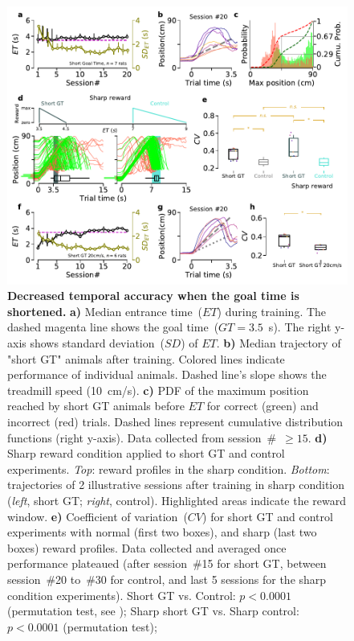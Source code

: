 \begin{figure}[bt!]
  \begin{center}
    \includegraphics[width=.8\linewidth]{ch-time/figures/ShortGT-SharpTrd.pdf}
    \caption[Short GT and sharp conditions]
    {\textbf{Decreased temporal accuracy when the goal time is shortened.}
    \textbf{a)}
    Median entrance time~($ET$) during training.
    The dashed magenta line shows the goal time~($GT=3.5$~s).
    The right y-axis shows standard deviation~($SD$) of $ET$.
    \textbf{b)}
    Median trajectory of "short GT" animals after training.
    Colored lines indicate performance of individual animals.
    Dashed line's slope shows the treadmill speed (10~cm/s).
    \textbf{c)}
    PDF of the maximum position reached by short GT animals before $ET$ for correct (green) and incorrect (red) trials.
    Dashed lines represent cumulative distribution functions (right y-axis).
    Data collected from session~\#~$\geq15$.
    \textbf{d)} 
    Sharp reward condition applied to short GT and control experiments.
    \textit{Top}: reward profiles in the sharp condition.
    \textit{Bottom}: trajectories of 2 illustrative sessions after training in sharp condition (\textit{left}, short GT; \textit{right}, control).
    Highlighted areas indicate the reward window.
    \textbf{e)}
    Coefficient of variation~($CV$) for short GT and control experiments with normal (first two boxes), and sharp (last two boxes) reward profiles.
    Data collected and averaged once performance plateaued (after session~\#15 for short GT, between session~\#20 to~\#30 for control, and last 5 sessions for the sharp condition experiments).
    Short GT vs. Control: $p<0.0001$ (permutation test, see );
    Sharp short GT vs. Sharp control: $p<0.0001$ (permutation test);
}
\end{center}
\end{figure}
